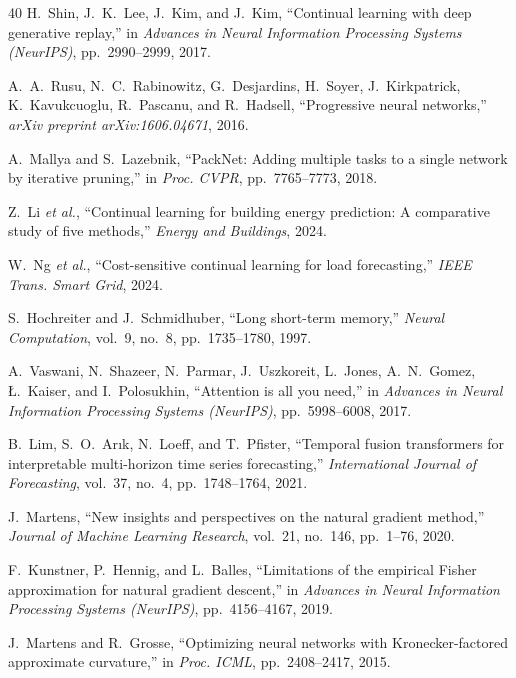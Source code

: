 \documentclass[journal]{IEEEtran}
\begin{document}
\begin{thebibliography}{40}
H.~Shin, J.~K.~Lee, J.~Kim, and J.~Kim, ``Continual learning with deep
generative replay,'' in \emph{Advances in Neural Information Processing
Systems (NeurIPS)}, pp.~2990--2999, 2017.

A.~A.~Rusu, N.~C.~Rabinowitz, G.~Desjardins, H.~Soyer, J.~Kirkpatrick,
K.~Kavukcuoglu, R.~Pascanu, and R.~Hadsell, ``Progressive neural
networks,'' \emph{arXiv preprint arXiv:1606.04671}, 2016.

A.~Mallya and S.~Lazebnik, ``PackNet: Adding multiple tasks to a
single network by iterative pruning,'' in \emph{Proc. CVPR},
pp.~7765--7773, 2018.

Z.~Li \emph{et al.}, ``Continual learning for building energy
prediction: A comparative study of five methods,'' \emph{Energy and
Buildings}, 2024.

W.~Ng \emph{et al.}, ``Cost-sensitive continual learning for load
forecasting,'' \emph{IEEE Trans. Smart Grid}, 2024.

S.~Hochreiter and J.~Schmidhuber, ``Long short-term memory,''
\emph{Neural Computation}, vol.~9, no.~8, pp.~1735--1780, 1997.

A.~Vaswani, N.~Shazeer, N.~Parmar, J.~Uszkoreit, L.~Jones, A.~N.~Gomez,
\L{}.~Kaiser, and I.~Polosukhin, ``Attention is all you need,'' in
\emph{Advances in Neural Information Processing Systems (NeurIPS)},
pp.~5998--6008, 2017.

B.~Lim, S.~O.~Ar{\i}k, N.~Loeff, and T.~Pfister, ``Temporal fusion
transformers for interpretable multi-horizon time series forecasting,''
\emph{International Journal of Forecasting}, vol.~37, no.~4,
pp.~1748--1764, 2021.

J.~Martens, ``New insights and perspectives on the natural gradient
method,'' \emph{Journal of Machine Learning Research}, vol.~21,
no.~146, pp.~1--76, 2020.

F.~Kunstner, P.~Hennig, and L.~Balles, ``Limitations of the empirical
Fisher approximation for natural gradient descent,'' in \emph{Advances
in Neural Information Processing Systems (NeurIPS)}, pp.~4156--4167,
2019.

J.~Martens and R.~Grosse, ``Optimizing neural networks with
Kronecker-factored approximate curvature,'' in \emph{Proc. ICML},
pp.~2408--2417, 2015.


\end{thebibliography}
\end{document}
